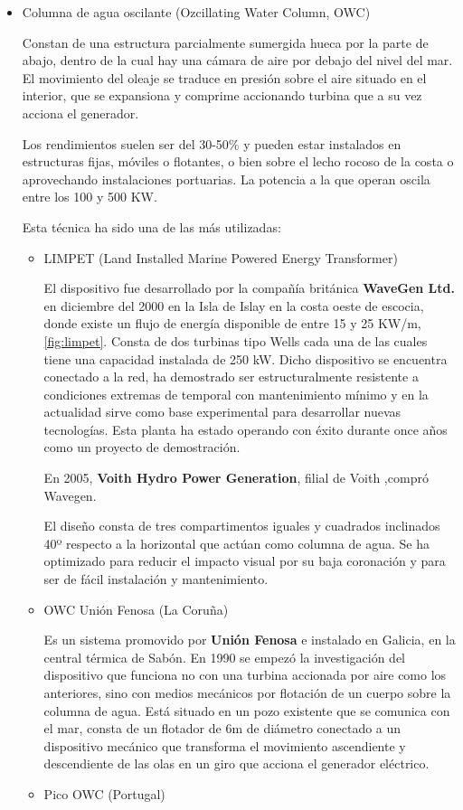 \begin{itemize}
\item
  Columna de agua oscilante (Ozcillating Water Column, OWC)

  Constan de una estructura parcialmente sumergida hueca por la parte de
  abajo, dentro de la cual hay una cámara de aire por debajo del nivel
  del mar. El movimiento del oleaje se traduce en presión sobre el aire
  situado en el interior, que se expansiona y comprime accionando
  turbina que a su vez acciona el generador.

  Los rendimientos suelen ser del 30-50\% y pueden estar instalados en
  estructuras fijas, móviles o flotantes, o bien sobre el lecho rocoso
  de la costa o aprovechando instalaciones portuarias. La potencia a la
  que operan oscila entre los 100 y 500 KW.

  Esta técnica ha sido una de las más utilizadas:

  \begin{itemize}
  \item
    LIMPET (Land Installed Marine Powered Energy Transformer)

    El dispositivo fue desarrollado por la compañía británica
    \textbf{WaveGen Ltd.} en diciembre del 2000 en la Isla de Islay en
    la costa oeste de escocia, donde existe un flujo de energía
    disponible de entre 15 y 25 KW/m, \autoref{fig:limpet}. Consta de dos turbinas tipo Wells
    cada una de las cuales tiene una capacidad instalada de 250 kW.
    Dicho dispositivo se encuentra conectado a la red, ha demostrado ser
    estructuralmente resistente a condiciones extremas de temporal con
    mantenimiento mínimo y en la actualidad sirve como base experimental
    para desarrollar nuevas tecnologías. Esta planta ha estado operando
    con éxito durante once años como un proyecto de demostración.

    En 2005, \textbf{Voith Hydro Power Generation}, filial de Voith
    ,compró Wavegen.


    El diseño consta de tres compartimentos iguales y cuadrados
    inclinados 40º respecto a la horizontal que actúan como columna de
    agua. Se ha optimizado para reducir el impacto visual por su baja
    coronación y para ser de fácil instalación y mantenimiento.
  \item
    OWC Unión Fenosa (La Coruña)

    Es un sistema promovido por \textbf{Unión Fenosa} e instalado en
    Galicia, en la central térmica de Sabón. En 1990 se empezó la
    investigación del dispositivo que funciona no con una turbina
    accionada por aire como los anteriores, sino con medios mecánicos
    por flotación de un cuerpo sobre la columna de agua. Está situado en
    un pozo existente que se comunica con el mar, consta de un flotador
    de 6m de diámetro conectado a un dispositivo mecánico que transforma
    el movimiento ascendiente y descendiente de las olas en un giro que
    acciona el generador eléctrico.
  \item
    Pico OWC (Portugal)


\end{itemize}
\end{itemize}
